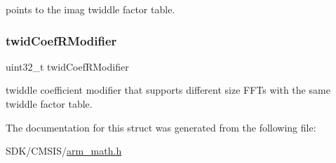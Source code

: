 points to the imag twiddle factor table. \mbox{\label{structarm__rfft__instance__f32_a5b06f7f76c018db993fe6acc5708c589}} 
\subsubsection{\texorpdfstring{twid\+Coef\+R\+Modifier}{twidCoefRModifier}}
{\footnotesize\ttfamily uint32\+\_\+t twid\+Coef\+R\+Modifier}

twiddle coefficient modifier that supports different size F\+F\+Ts with the same twiddle factor table. 

The documentation for this struct was generated from the following file\+:\begin{DoxyCompactItemize}
\item 
S\+D\+K/\+C\+M\+S\+I\+S/\mbox{\hyperlink{arm__math_8h}{arm\+\_\+math.\+h}}\end{DoxyCompactItemize}
